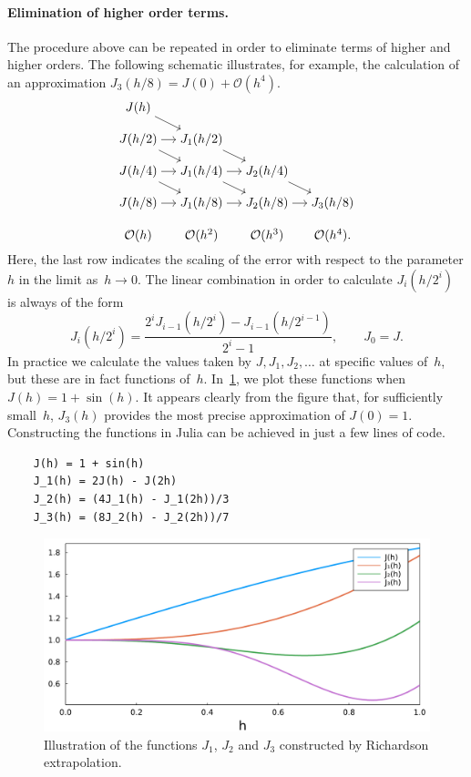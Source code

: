 \paragraph{Elimination of higher order terms.}
The procedure above can be repeated in order to eliminate terms of higher and higher orders.
The following schematic illustrates,
for example, the calculation of an approximation $J_3(h/8) = J(0) + \mathcal O(h^4)$.
\[
    \begin{tikzcd}[cramped, sep=small]
        J(h) \arrow[dr]  \\
        J(h/2) \arrow[r] \arrow[dr] & J_1(h/2) \arrow[dr]  \\
        J(h/4) \arrow[r] \arrow[dr] & J_1(h/4) \arrow[r] \arrow[dr] & J_2(h/4) \arrow[dr]  \\
        J(h/8) \arrow[r] & J_1(h/8) \arrow[r] & J_2(h/8) \arrow[r] & J_3(h/8) \\
        \mathcal O(h) & \mathcal O(h^2) & \mathcal O(h^3) & \mathcal O(h^4).
    \end{tikzcd}
\]
Here, the last row indicates the scaling of the error with respect to the parameter $h$ in the limit as~$h \to 0$.
The linear combination in order to calculate $J_{i} (h/2^i)$ is always of the form
\[
    J_i(h/2^i) = \frac{2^i J_{i-1} (h/2^i) - J_{i-1}(h/2^{i-1})}{2^i - 1}, \qquad J_0 = J.
\]
In practice we calculate the values taken by $J, J_1, J_2, \dotsc$ at specific values of~$h$,
but these are in fact functions of~$h$.
In~\cref{fig:richardson},
we plot these functions when~$J(h) = 1 + \sin(h)$.
It appears clearly from the figure that,
for sufficiently small~$h$,
$J_3(h)$ provides the most precise approximation of $J(0) = 1$.
Constructing the functions in Julia can be achieved in just a few lines of code.
\begin{verbatim}
    J(h) = 1 + sin(h)
    J_1(h) = 2J(h) - J(2h)
    J_2(h) = (4J_1(h) - J_1(2h))/3
    J_3(h) = (8J_2(h) - J_2(2h))/7
\end{verbatim}
\begin{figure}[ht]
    \centering
    \includegraphics[width=0.8\linewidth]{figures/richardson.pdf}
    \caption{Illustration of the functions $J_1$, $J_2$ and $J_3$ constructed by Richardson extrapolation.}%
    \label{fig:richardson}
\end{figure}

